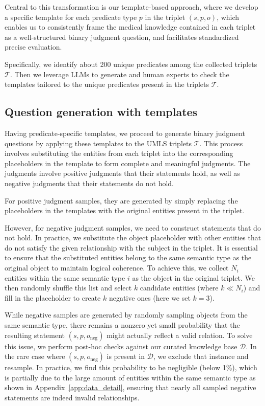 Central to this transformation is our template-based approach, where we develop a specific template for each predicate type $p$ in the triplet $(s, p, o)$, which enables us to consistently frame the medical knowledge contained in each triplet as a well-structured binary judgment question, and facilitates standardized precise evaluation.

Specifically, we identify about 200 unique predicates among the collected triplets $\mathcal{T}$. Then we leverage LLMs to generate and human experts to check the templates tailored to the unique predicates present in the triplets $\mathcal{T}$.

\subsection{Question generation with templates}
\label{sec:data_sub}
Having predicate-specific templates, we proceed to generate binary judgment questions by applying these templates to the UMLS triplets $\mathcal{T}$. 
This process involves substituting the entities from each triplet into the corresponding placeholders in the template to form complete and meaningful judgments. The judgments involve positive judgments that their statements hold, as well as negative judgments that their statements do not hold.

For positive judgment samples, they are generated by simply replacing the placeholders in the templates with the original entities present in the triplet. 

However, for negative judgment samples, we need to construct statements that do not hold. In practice, we substitute the object placeholder with other entities that do not satisfy the given relationship with the subject in the triplet. It is essential to ensure that the substituted entities belong to the same semantic type as the original object to maintain logical coherence.
To achieve this, we collect $N_i$ entities within the same semantic type $i$ as the object in the original triplet. We then randomly shuffle this list and select $k$ candidate entities (where $k \ll N_i$) and fill in the placeholder to create $k$ negative ones (here we set $k=3$). 

While negative samples are generated by randomly sampling objects from the same semantic type, there remains a nonzero yet small probability that the resulting statement $(s,p,o_{\text{neg}})$ might actually reflect a valid relation. 
To solve this issue, we perform post-hoc checks against our curated knowledge base $\mathcal{D}$. In the rare case where $(s,p,o_{\text{neg}})$ is present in $\mathcal{D}$, we exclude that instance and resample. In practice, we find this probability to be negligible (below 1\%), which is partially due to the large amount of entities within the same semantic type as shown in Appendix~\ref{app:data_detail}, ensuring that nearly all sampled negative statements are indeed invalid relationships.

